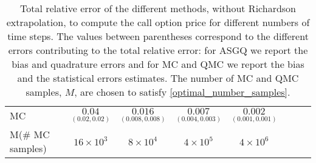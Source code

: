 \begin{table}[h!]
\begin{small}
\begin{tabular}{l*{6}{c}r}
			\hline
			MC    & $\underset{(0.02,0.02)}{\mathbf{0.04}}$  &  $\underset{(0.008,0.008)}{\mathbf{0.016}}$  & $\underset{(0.004,0.003)}{\mathbf{0.007}}$ & $\underset{(0.001,0.001)}{\mathbf{0.002}}$  \\	
			M(\# MC samples) 	& $16 \times 10^3$  &  $8 \times 10^4$  & $ 4 \times 10^5$ & $4 \times 10^6$  \\
			\bottomrule[1.25pt]
		\end{tabular}
		\caption{Total relative error of the different methods, without Richardson extrapolation, to compute the call option price for different numbers of time steps. The values between parentheses correspond to the different errors contributing to the total relative error: for ASGQ we report the bias and quadrature errors and for MC and QMC we report the bias and the statistical errors estimates. The number of MC and QMC  samples, $M$, are chosen to satisfy \eqref{optimal_number_samples}.}
		\label{Total error of MISC and MC to compute Call option price of the different tolerances for different number of time steps. Case set 3, without Richardson extrapolation. The numbers between parentheses are the corresponding absolute errors.}
	\end{small}
\end{table}


